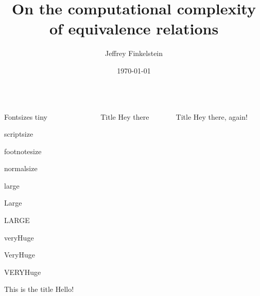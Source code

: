 \documentclass[final]{beamer}
\title{On the computational complexity of equivalence relations}
\author{Jeffrey Finkelstein}
\institute{Tufts University}
\date{\today}
\begin{document}
\begin{frame}{} 
  \begin{columns}[t]
    \begin{column}{.3\linewidth}
      \begin{block}{\large Fontsizes}
        {\tiny tiny}\par
        {\scriptsize scriptsize}\par
        {\footnotesize footnotesize}\par
        {\normalsize normalsize}\par
        {\large large}\par
        {\Large Large}\par
        {\LARGE LARGE}\par
        {\veryHuge veryHuge}\par
        {\VeryHuge VeryHuge}\par
        {\VERYHuge VERYHuge}\par
      \end{block}
      \begin{block}{This is the title}
        Hello!
      \end{block}
    \end{column}
    \begin{column}{.3\linewidth}
      \begin{block}{\large Title}
        Hey there
      \end{block}
    \end{column}
    \begin{column}{.3\linewidth}
      \begin{block}{\large Title}
        Hey there, again!
      \end{block}
    \end{column}
  \end{columns}
\end{frame}
\end{document}
